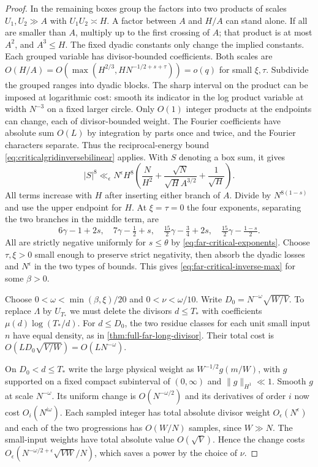 \documentclass[11pt,a4paper]{article}
\numberwithin{equation}{section}
\begin{document}
\begin{proof}
In the remaining boxes group the factors into two products
of scales $U_1,U_2\gg A$ with $U_1U_2\asymp H$. A factor
between $A$ and $H/A$ can stand alone. If all are smaller
than $A$, multiply up to the first crossing of $A$; that
product is at most $A^2$, and $A^3\le H$. The fixed dyadic
constants only change the implied constants. Each grouped
variable has divisor-bounded coefficients. Both scales are
$O(H/A)=O(\max(H^{2/3},HN^{-1/2+s+\tau}))=o(q)$ for small
$\xi,\tau$. Subdivide the grouped ranges into dyadic blocks.
The sharp interval on the product can be imposed at logarithmic
cost: smooth its indicator in the log product variable at width
$N^{-3}$ on a fixed larger circle. Only $O(1)$ integer products
at the endpoints can change, each of divisor-bounded weight.
The Fourier coefficients have absolute sum $O(L)$ by integration
by parts once and twice, and the Fourier characters separate.
Thus the reciprocal-energy bound \eqref{eq:criticalgridinversebilinear}
applies. With $S$ denoting a box sum, it gives
\[
 |S|^8\ll_\epsilon N^\epsilon H^8
   \left(\frac N{H^2}+\frac{\sqrt N}{\sqrt H A^{3/2}}
                       +\frac1{\sqrt H}\right).
\]
All terms increase with $H$ after inserting either branch of
$A$. Divide by $N^{8(1-s)}$ and use the upper endpoint for $H$.
At $\xi=\tau=0$ the four exponents, separating the two branches
in the middle term, are
\[
 6\gamma-1+2s,\quad 7\gamma-\tfrac12+s,\quad
 \tfrac{15}2\gamma-\tfrac34+2s,\quad
 \tfrac{15}2\gamma-\tfrac{1-s}{2}.
\]
All are strictly negative uniformly for $s\le\theta$ by
\eqref{eq:far-critical-exponents}. Choose $\tau,\xi>0$ small
enough to preserve strict negativity, then absorb the dyadic
losses and $N^\epsilon$ in the two types of bounds. This gives
\eqref{eq:far-critical-inverse-max} for some $\beta>0$.

Choose $0<\omega<\min(\beta,\xi)/20$ and
$0<\nu<\omega/10$. Write $D_0=N^{-\omega}\sqrt{W/V}$.
To replace $\Lambda$ by $U_{T_*}$ we must delete the divisors
$d\le T_*$ with coefficients $\mu(d)\log(T_*/d)$. For $d\le
D_0$, the two residue classes for each unit small input $n$
have equal density, as in \cref{thm:full-far-long-divisor}.
Their total cost is $O(L D_0\sqrt{V/W})=O(LN^{-\omega})$.

On $D_0<d\le T_*$ write the large physical weight as
$W^{-1/2}g(m/W)$, with $g$ supported on a fixed compact
subinterval of $(0,\infty)$ and $\|g\|_{H^1}\ll1$. Smooth
$g$ at scale $N^{-\omega}$. Its uniform change is
$O(N^{-\omega/2})$ and its derivatives of order $i$ now
cost $O_i(N^{i\omega})$. Each sampled integer has total
absolute divisor weight $O_\epsilon(N^\epsilon)$ and each
of the two progressions has $O(W/N)$ samples, since $W\gg N$.
The small-input weights have total absolute value $O(\sqrt V)$.
Hence the change costs
$O_\epsilon(N^{-\omega/2+\epsilon}\sqrt{VW}/N)$, which saves
a power by the choice of $\nu$.


\end{proof}
\end{document}
